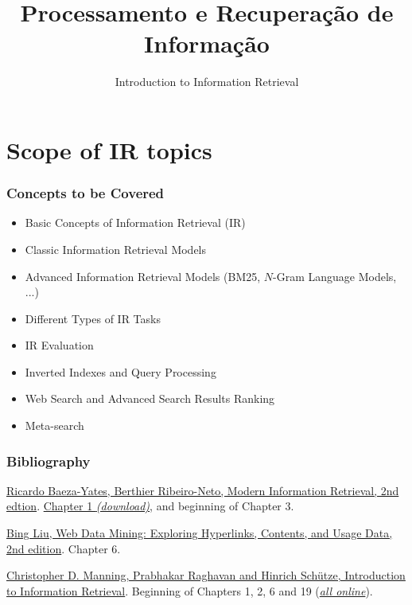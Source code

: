 \documentclass[svgnames]{beamer}
\title{Processamento e Recuperação de Informação}
\subtitle{Introduction to Information Retrieval}
\begin{document}
\maketitle
\makeoutline

\section{Scope of IR topics}

\begin{frame} \frametitle{Concepts to be Covered}

\begin{itemize}
   \item Basic Concepts of Information Retrieval (IR)
   \item Classic Information Retrieval Models

   \item Advanced Information Retrieval Models (BM25, $N$-Gram Language Models, ...)
   
   \item Different Types of IR Tasks

   \item IR Evaluation

   \item Inverted Indexes and Query Processing

   \item Web Search and Advanced Search Results Ranking

   \item Meta-search
\end{itemize}

\end{frame}


\begin{frame} \frametitle{Bibliography}

    \begin{block}{}
      \href{http://www.mir2ed.org/}{Ricardo Baeza-Yates,
            Berthier Ribeiro-Neto, Modern Information Retrieval, 2nd
            edtion}. \href{http://grupoweb.upf.es/WRG/mir2ed/pdf/chapter1.pdf}
          {Chapter 1 \emph{(download)}}, and beginning of Chapter 3.
    \end{block}

    \begin{block}{}
      \href{http://www.cs.uic.edu/~liub/WebMiningBook.html}{Bing Liu, Web Data Mining: Exploring Hyperlinks, Contents, and Usage Data, 2nd edition}. Chapter 6.   
    \end{block}

    \begin{block}{}
      \href{http://nlp.stanford.edu/IR-book/}{Christopher D. Manning, Prabhakar Raghavan and Hinrich Schütze, Introduction to Information Retrieval}. Beginning of Chapters 1, 2, 6 and 19 (\href{http://nlp.stanford.edu/IR-book/}{\emph{all online}}). 
    \end{block}

\end{frame}
\end{document}
